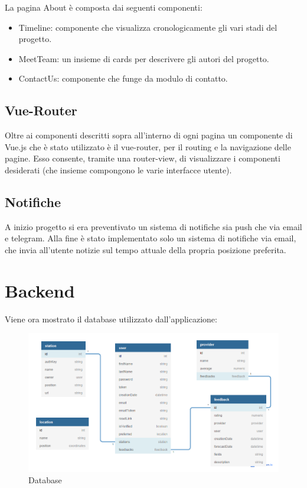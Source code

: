 La pagina About è composta dai seguenti componenti:
\begin{itemize}
    \item Timeline: componente che visualizza cronologicamente gli vari stadi del progetto.
    \item MeetTeam: un insieme di cards per descrivere gli autori del progetto. 
    \item ContactUs: componente che funge da modulo di contatto.
\end{itemize}
\subsection{Vue-Router}
Oltre ai componenti descritti sopra all'interno di ogni pagina un componente di Vue.js che è stato utilizzato è il vue-router, per il routing e la navigazione delle pagine.
Esso consente, tramite una router-view, di visualizzare i componenti
desiderati (che insieme compongono le varie interfacce utente).
\subsection{Notifiche}
A inizio progetto si era preventivato un sistema di notifiche sia push che via email e telegram. 
Alla fine è stato implementato solo un sistema di notifiche via email, che invia all'utente notizie sul tempo attuale della propria posizione preferita. 





\section{Backend}
Viene ora mostrato il database utilizzato dall'applicazione:
\begin{figure}[H]
    \caption{Database}
    \label{fig:Home}
    \centering
    \includegraphics[width=1.0\textwidth]{DrawIo/database.png}
\end{figure}
